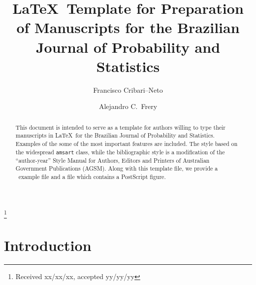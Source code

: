 \documentclass[12pt,twoside,reqno,final]{bjps}
\theoremstyle{plain}
\numberwithin{equation}{section}
\begin{document}
\title[Template for the BJPS]
      {\LaTeX\ Template for Preparation of Manuscripts for the Brazilian Journal of Probability and Statistics}
 
\author[F.\ Cribari-Neto]{Francisco Cribari--Neto}
\address{Departamento de Estat\'{\i}stica\\
Universidade Federal de Pernambuco\\
Cidade Universit\'{a}ria\\
Recife/PE, 50740--540, Brazil}

\author[A.C.\ Frery]{Alejandro C.\ Frery}
\address{Instituto de Computa\c c\~ao\\
Universidade Federal de Alagoas\\
BR 104 Norte km 97\\
Macei\'o/AL, 57072--970, Brazil}

\thanks{Received xx/xx/xx, accepted yy/yy/yy}


\begin{abstract}
This document is intended to serve as a template for authors willing to type their manuscripts in \LaTeX\ for the Brazilian Journal of Probability and Statistics.
Examples of the some of the most important features are included.
The style based on the widespread \verb+amsart+ class, while the bibliographic style is a modification of the ``author-year'' Style Manual for Authors, Editors and Printers of Australian Government Publications (AGSM).
Along with this template file, we provide a 
\BibTeX\ example file and a file which contains a PostScript figure.
\end{abstract}

\maketitle

\section{Introduction}\label{sec:intro}
\end{document}
